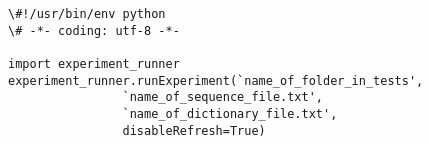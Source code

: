\begin{tcolorbox}[breakable,colback=white,colframe=blue,width=\dimexpr\textwidth+12mm\relax,enlarge left by=-6mm,enlarge right by=6mm]

\begin{lstlisting}
\#!/usr/bin/env python
\# -*- coding: utf-8 -*-

import experiment_runner
experiment_runner.runExperiment(`name_of_folder_in_tests', 
				`name_of_sequence_file.txt', 
				`name_of_dictionary_file.txt', 
				disableRefresh=True)
\end{lstlisting}

\end{tcolorbox}

